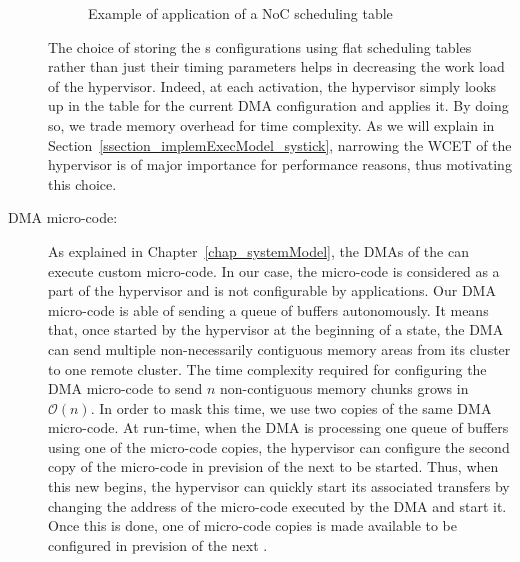 \documentclass[main.tex]{subfiles}
\begin{document}
\begin{description}
\begin{example}
            \begin{figure}
                \centering
                \scalebox{1}{}
                \caption{Example of application of a NoC scheduling table}
                \label{fig_implemExecModel_exNoCSchedule}
            \end{figure}
        \end{example}
        The choice of storing the \PC{}s configurations using flat scheduling
        tables rather than just their timing parameters helps in decreasing the
        work load of the hypervisor. Indeed, at each activation, the hypervisor
        simply looks up in the table for the current DMA configuration and
        applies it. By doing so, we trade memory overhead for time complexity.
        As we will explain in Section~\ref{ssection_implemExecModel_systick},
        narrowing the WCET of the hypervisor is of major importance for
        performance reasons, thus motivating this choice.


    \item[DMA micro-code: ] As explained in Chapter~\ref{chap_systemModel}, the
        DMAs of the \mppalong can execute custom micro-code. In our case, the
        micro-code is considered as a part of the hypervisor and is not
        configurable by applications. Our DMA micro-code is able of sending a
        queue of buffers autonomously. It means that, once started by the
        hypervisor at the beginning of a \PC{} state, the DMA can send multiple
        non-necessarily contiguous memory areas from its cluster to one remote
        cluster. The time complexity required for configuring the DMA
        micro-code to send $n$ non-contiguous memory chunks grows in
        $\mathcal{O}(n)$. In order to mask this time, we use two copies of the
        same DMA micro-code. At run-time, when the DMA is processing one queue
        of buffers using one of the micro-code copies, the hypervisor can
        configure the second copy of the micro-code in prevision of the next
        \PC{} to be started. Thus, when this new \PC{} begins, the hypervisor
        can quickly start its associated transfers by changing the address of
        the micro-code executed by the DMA and start it. Once this is done, one
        of micro-code copies is made available to be configured in prevision of
        the next \PC{}.


\end{description}
\end{document}
